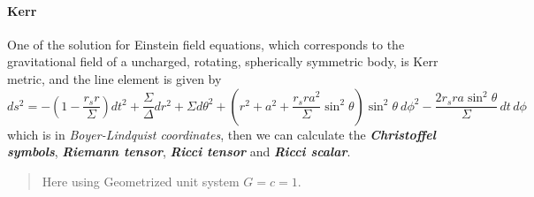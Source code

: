 \documentclass[11pt]{article}
\begin{document}
    \hypertarget{kerr}{%
\paragraph{Kerr}\label{kerr}}

One of the solution for Einstein field equations, which corresponds to
the gravitational field of a uncharged, rotating, spherically symmetric
body, is Kerr metric, and the line element is given by \[
ds^2 = -\left(1-\frac{r_{s}r}{\Sigma}\right)dt^2+\frac{\Sigma}{\Delta}dr^2+\Sigma d\theta^2+\left(r^2+a^2+\frac{r_{s}ra^2}{\Sigma}\sin^2\theta \right)\sin^2\theta \ d\phi^2-{\frac{2r_{s}ra\sin^2\theta}{\Sigma}}\,dt\,d\phi
\] which is in \emph{Boyer-Lindquist coordinates}, then we can calculate
the \textbf{\emph{Christoffel symbols}}, \textbf{\emph{Riemann tensor}},
\textbf{\emph{Ricci tensor}} and \textbf{\emph{Ricci scalar}}.

\begin{quote}
Here using Geometrized unit system \(G=c=1\).
\end{quote}
\end{document}
